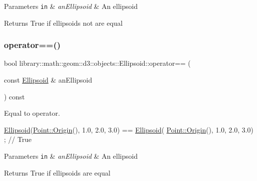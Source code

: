 \begin{DoxyParams}[1]{Parameters}
\mbox{\tt in}  & {\em an\+Ellipsoid} & An ellipsoid \\
\hline
\end{DoxyParams}
\begin{DoxyReturn}{Returns}
True if ellipsoids not are equal 
\end{DoxyReturn}
\mbox{\label{classlibrary_1_1math_1_1geom_1_1d3_1_1objects_1_1_ellipsoid_a259ca94e493d1e8694292aaa579ae1e7}} 
\subsubsection{\texorpdfstring{operator==()}{operator==()}}
{\footnotesize\ttfamily bool library\+::math\+::geom\+::d3\+::objects\+::\+Ellipsoid\+::operator== (\begin{DoxyParamCaption}\item[{const \hyperlink{classlibrary_1_1math_1_1geom_1_1d3_1_1objects_1_1_ellipsoid}{Ellipsoid} \&}]{an\+Ellipsoid }\end{DoxyParamCaption}) const}



Equal to operator. 


\begin{DoxyCode}
\hyperlink{classlibrary_1_1math_1_1geom_1_1d3_1_1objects_1_1_ellipsoid_aae81fe0edc7f0e8d4590ea89ae73cb14}{Ellipsoid}(\hyperlink{classlibrary_1_1math_1_1geom_1_1d3_1_1objects_1_1_point_ab2a38e285c562e50bf350272c083986f}{Point::Origin}(), 1.0, 2.0, 3.0) == \hyperlink{classlibrary_1_1math_1_1geom_1_1d3_1_1objects_1_1_ellipsoid_aae81fe0edc7f0e8d4590ea89ae73cb14}{Ellipsoid}(
      \hyperlink{classlibrary_1_1math_1_1geom_1_1d3_1_1objects_1_1_point_ab2a38e285c562e50bf350272c083986f}{Point::Origin}(), 1.0, 2.0, 3.0) ; \textcolor{comment}{// True}
\end{DoxyCode}



\begin{DoxyParams}[1]{Parameters}
\mbox{\tt in}  & {\em an\+Ellipsoid} & An ellipsoid \\
\hline
\end{DoxyParams}
\begin{DoxyReturn}{Returns}
True if ellipsoids are equal 
\end{DoxyReturn}
\mbox{\label{classlibrary_1_1math_1_1geom_1_1d3_1_1objects_1_1_ellipsoid_af912ba3948bd06ac517c727210082df3}} 
